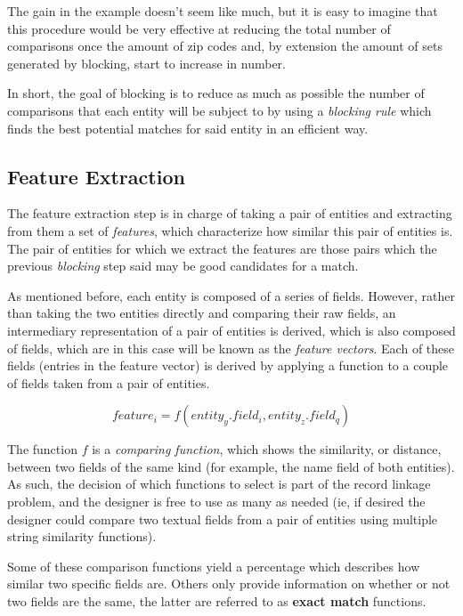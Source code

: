 \documentclass[epsfig,a4paper,11pt,titlepage,twoside,openany]{book}
\begin{document}
The gain in the example doesn't seem like much, but it is easy to imagine that
this procedure would be very effective at reducing the total number of
comparisons once the amount of zip codes and, by extension the amount of sets
generated by blocking, start to increase in number.

In short, the goal of blocking is to reduce as much as possible the number of
comparisons that each entity will be subject to by using a \textit{blocking
  rule} which finds the best potential matches for said entity in an efficient
way.

  
\subsection{Feature Extraction}
\label{sec:rl-workflow-feat-extraction}

The feature extraction step is in charge of taking a pair of entities and
extracting from them a set of \textit{features}, which characterize how similar
this pair of entities is. The pair of entities for which we extract the features
are those pairs which the previous \textit{blocking} step said may be good
candidates for a match.

As mentioned before, each entity is composed of a series of fields. 
However, rather than
taking the two entities directly and comparing their raw fields, an intermediary representation of a pair of entities is derived, which is also
composed of fields, which are in this case will be known as the \textit{feature vectors}. Each of
these fields (entries in the feature vector) is derived by applying a function
to a couple of fields taken from a pair of entities.

$$
feature_i = f(entity_y.field_i , entity_z.field_q)
$$

The function $f$ is a \textit{comparing function}, which shows the
similarity, or distance, between two fields of the same kind (for example, the
name field of both entities). As such, the decision of which functions to select is
part of the record linkage problem, and the designer is free to use as many as needed (ie, if desired the designer could compare two textual fields from a pair of entities
using multiple string similarity functions).

Some of these comparison functions yield a percentage which describes how
similar two specific fields are. Others only provide information on whether or not two fields are the same,
the latter are referred to as \textbf{exact match} functions.
\end{document}
